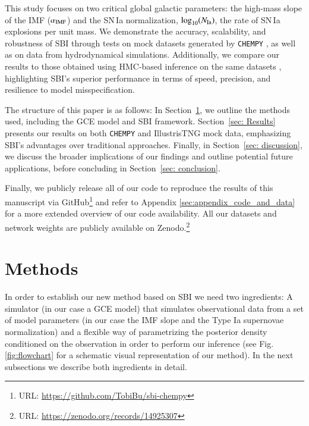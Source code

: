 \documentclass{aa}
\begin{document}
This study focuses on two critical global galactic parameters: 
the high-mass slope of the \citet[Tab.\,1]{2003PASP..115..763C} IMF ($\alpha_{\rm IMF}$) and the SN\,Ia normalization, $\log_{10}(N_{\rm Ia})$, the rate of SN\,Ia explosions per unit mass. We demonstrate the accuracy, scalability, and robustness of SBI through tests on mock datasets generated by \texttt{CHEMPY} \citep{Rybizki_2017}, as well as on data from hydrodynamical simulations. Additionally, we compare our results to those obtained using HMC-based inference on the same datasets \citep[see][]{Philcox_2019}, highlighting SBI's superior performance in terms of speed, precision, and resilience to model misspecification.

The structure of this paper is as follows: In Section~\ref{sec:methods}, we outline the methods used, including the GCE model and SBI framework. Section~\ref{sec: Results} presents our results on both \texttt{CHEMPY} and IllustrisTNG \citep{Pillepich2018} mock data, emphasizing SBI's advantages over traditional approaches. Finally, in Section~\ref{sec: discussion}, we discuss the broader implications of our findings and outline potential future applications, before concluding in Section~\ref{sec: conclusion}.

Finally, we publicly release all of our code to reproduce the results of this manuscript via GitHub\footnote{URL: {\url{https://github.com/TobiBu/sbi-chempy}}} and refer to Appendix \ref{sec:appendix_code_and_data} for a more extended overview of our code availability. All our datasets and network weights are publicly available on Zenodo.\footnote{URL: \url{https://zenodo.org/records/14925307}}

\section{Methods}
\label{sec:methods}

In order to establish our new method based on SBI we need two ingredients: A simulator (in our case a GCE model) that simulates observational data from a set of model parameters (in our case the IMF slope and the Type Ia supernovae normalization) and a flexible way of parametrizing the posterior density conditioned on the observation in order to perform our inference (see Fig. \ref{fig:flowchart} for a schematic visual representation of our method). In the next subsections we describe both ingredients in detail.
\end{document}
